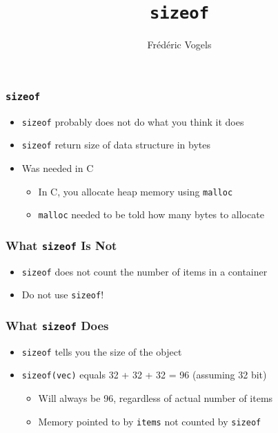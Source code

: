 \usepackage{ucll-code}
\usetikzlibrary{shadows,shapes.multipart}

\title{\texttt{sizeof}}
\author{Fr\'ed\'eric Vogels}




\begin{frame}
  \titlepage
\end{frame}

\begin{frame}
  \frametitle{\texttt{sizeof}}
  \begin{itemize}
    \item \texttt{sizeof} probably does not do what you think it does
    \item \texttt{sizeof} return size of data structure in bytes
    \item Was needed in C
          \begin{itemize}
            \item In C, you allocate heap memory using \texttt{malloc}
            \item \texttt{malloc} needed to be told how many bytes to allocate
          \end{itemize}
  \end{itemize}
\end{frame}

\begin{frame}
  \frametitle{What \texttt{sizeof} Is Not}
  \begin{itemize}
    \item \texttt{sizeof} does not count the number of items in a container
    \item Do not use \texttt{sizeof}!
  \end{itemize}
\end{frame}

\begin{frame}
  \frametitle{What \texttt{sizeof} Does}
  \begin{itemize}
    \item \texttt{sizeof} tells you the size of the object
    \item \texttt{sizeof(vec)} equals 32 + 32 + 32 = 96 (assuming 32 bit)
          \begin{itemize}
            \item Will always be 96, regardless of actual number of items
            \item Memory pointed to by \texttt{items} not counted by \texttt{sizeof}
          \end{itemize}
  \end{itemize}
\end{frame}

